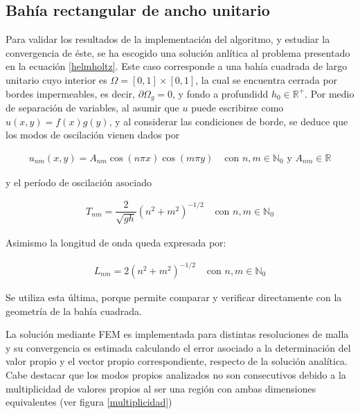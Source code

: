  \subsection{Bah\'ia rectangular de ancho unitario}
  Para validar los resultados de la implementaci\'on del algoritmo, y estudiar la convergencia de \'este, se ha escogido una soluci\'on anl\'itica al problema presentado en la ecuaci\'on \eqref{helmholtz}. Este caso corresponde a una bah\'ia cuadrada de largo unitario cuyo interior es $\Omega = [0,1]\times[0,1]$, la cual se encuentra cerrada por bordes impermeables, es decir, $\partial \Omega_g=0$, y fondo a profundidd $h_0\in\mathbb{R^+}$. Por medio de separaci\'on de variables, al asumir que $u$ puede escribirse como $u(x,y)=f(x)g(y)$, y al considerar las condiciones de borde, se deduce que los modos de oscilaci\'on vienen dados por 
  
  \begin{equation}
    \begin{array}{cc}
    u_{nm}(x,y)=A_{nm}\cos(n\pi x)\cos(m\pi y) & \text{ con } n,m \in \mathbb{N}_0 \text{ y } A_{nm}\in\mathbb{R}
    \end{array}
    \label{eq:bahia_cerrada_modo}
  \end{equation}

  y el per\'iodo de oscilaci\'on asociado
  
  \begin{equation}
    \begin{array}{cc}
    T_{nm}=\dfrac{2}{\sqrt{gh}}\left( n^2+m^2\right)^{-1/2} & \text{ con } n,m \in \mathbb{N}_0
    \end{array}
    \label{eq:bahia_cerrada_periodo}
  \end{equation}
  
Asimismo la longitud de onda queda expresada por: 

  \begin{equation}
    \begin{array}{cc}
    L_{nm}=2 \left( n^2+m^2\right)^{-1/2} & \text{ con } n,m \in \mathbb{N}_0
    \end{array}
    \label{eq:bahia_cerrada_longitud}
  \end{equation}

Se utiliza esta \'ultima, porque permite comparar y verificar directamente con la geometr\'ia de la bah\'ia cuadrada.

La soluci\'on mediante FEM es implementada para distintas resoluciones de malla y su convergencia es estimada calculando el error asociado a la determinaci\'on del valor propio y el vector propio correspondiente, respecto de la soluci\'on anal\'itica. Cabe destacar que los modos propios analizados no son consecutivos debido a la multiplicidad de valores propios al ser una regi\'on con ambas dimensiones equivalentes (ver figura \ref{multiplicidad})

